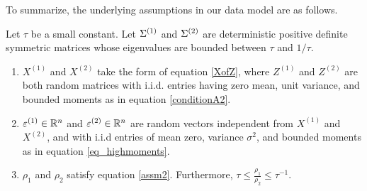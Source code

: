To summarize, the underlying assumptions in our data model are as follows.
\begin{assumption}\label{assm_big1}
Let $\tau$ be a small constant.
Let $\Sigma^{(1)}$ and $\Sigma^{(2)}$ are deterministic positive definite symmetric matrices whose eigenvalues are bounded between $\tau$ and $1 / \tau$.
\begin{enumerate}
\item  $X^{(1)}$ and $X^{(2)}$ take the form of equation \eqref{XofZ}, where $Z^{(1)}$ and $Z^{(2)}$ are both random matrices with i.i.d. entries having zero mean, unit variance, and bounded moments as in equation \eqref{conditionA2}.

\item $\varepsilon^{(1)} \in \mathbb{R}^{n}$ and $\varepsilon^{(2)} \in \mathbb{R}^{n}$ are random vectors independent from $X^{(1)}$ and $X^{(2)}$, and with i.i.d entries of mean zero, variance $\sigma^2$, and bounded moments as in equation \eqref{eq_highmoments}.

\item $\rho_{1}$ and $\rho_{2}$ satisfy equation \eqref{assm2}. Furthermore, $\tau \le \frac{\rho_1}{\rho_2}\le \tau^{-1}$.
\end{enumerate}
\end{assumption}


